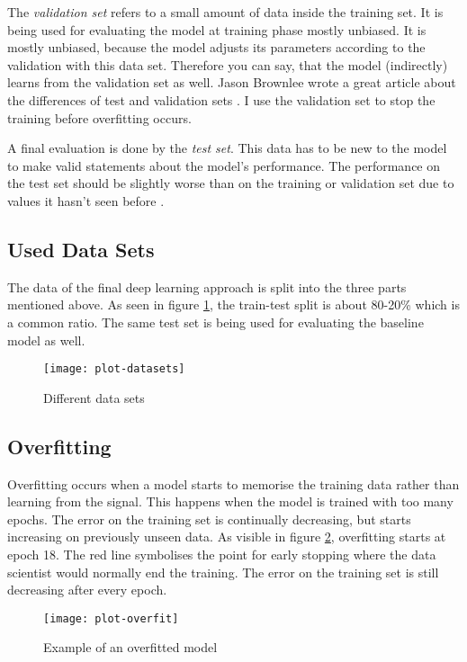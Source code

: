 The \emph{validation set} refers to a small amount of data inside the training set. It is being used for evaluating the model at training phase mostly unbiased. It is mostly unbiased, because the model adjusts its parameters according to the validation with this data set. Therefore you can say, that the model (indirectly) learns from the validation set as well. Jason Brownlee wrote a great article about the differences of test and validation sets \cite{brown17}. I use the validation set to stop the training before overfitting occurs.

A final evaluation is done by the \emph{test set}. This data has to be new to the model to make valid statements about the model's performance. The performance on the test set should be slightly worse than on the training or validation set due to values it hasn't seen before \cite{shah17}.

\subsection{Used Data Sets}

The data of the final deep learning approach is split into the three parts mentioned above. As seen in figure \ref{fig:datasets}, the train-test split is about 80-20\% which is a common ratio. The same test set is being used for evaluating the baseline model as well.

\begin{figure}[!ht]
    \centering
    \texttt{[image: plot-datasets]}
    \caption{Different data sets}
    \label{fig:datasets}
\end{figure}

\subsection{Overfitting}
\label{chap:overfitting}

Overfitting occurs when a model starts to memorise the training data rather than learning from the signal. This happens when the model is trained with too many epochs. The error on the training set is continually decreasing, but starts increasing on previously unseen data. As visible in figure \ref{fig:overfit}, overfitting starts at epoch 18. The red line symbolises the point for early stopping where the data scientist would normally end the training. The error on the training set is still decreasing after every epoch.

\begin{figure}[!ht]
    \centering
    \texttt{[image: plot-overfit]}
    \caption{Example of an overfitted model}
    \label{fig:overfit}
\end{figure}

